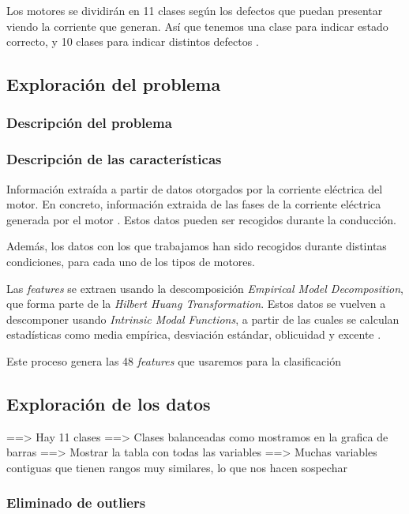 \documentclass[11pt]{article}
\begin{document}
Los motores se dividirán en 11 clases según los defectos que puedan presentar viendo la corriente que generan. Así que tenemos una clase para indicar estado correcto, y 10 clases para indicar distintos defectos \cite{paper_clasificacion_1:paper}.

\subsection{Exploración del problema}

\subsubsection{Descripción del problema}


\subsubsection{Descripción de las características}

Información extraída a partir de datos otorgados por la corriente eléctrica del motor. En concreto, información extraida de las fases de la corriente eléctrica generada por el motor \cite{paper_clasificacion_1:paper}. Estos datos pueden ser recogidos durante la conducción.

Además, los datos con los que trabajamos han sido recogidos durante distintas condiciones, para cada uno de los tipos de motores.

Las \emph{features} se extraen usando la descomposición \emph{Empirical Model Decomposition}, que forma parte de la \emph{Hilbert Huang Transformation}. Estos datos se vuelven a descomponer usando \emph{Intrinsic Modal Functions}, a partir de las cuales se calculan estadísticas como media empírica, desviación estándar, oblicuidad y excente \cite{paper_clasificacion_1:paper}.

Este proceso genera las 48 \emph{features} que usaremos para la clasificación

\pagebreak
\subsection{Exploración de los datos}

==> Hay 11 clases
==> Clases balanceadas como mostramos en la grafica de barras
==> Mostrar la tabla con todas las variables
    ==> Muchas variables contiguas que tienen rangos muy similares, lo que nos hacen sospechar

\subsubsection{Eliminado de outliers}
\end{document}
